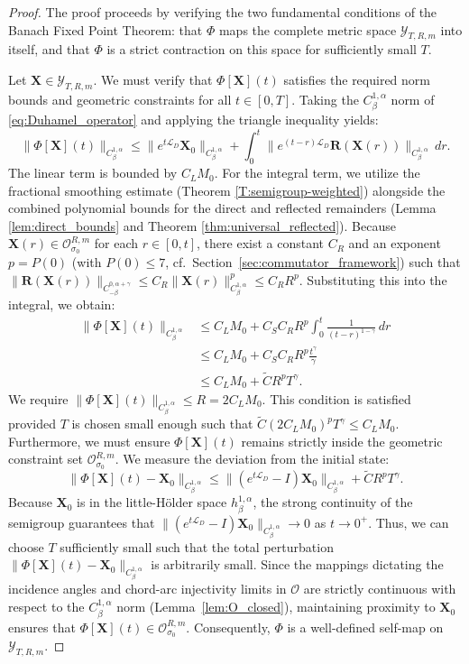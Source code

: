 \documentclass{amsart}
\begin{document}
\begin{proof}
The proof proceeds by verifying the two fundamental conditions of the Banach Fixed Point Theorem: that $\Phi$ maps the complete metric space $\mathcal{Y}_{T, R, m}$ into itself, and that $\Phi$ is a strict contraction on this space for sufficiently small $T$.


Let $\mathbf{X} \in \mathcal{Y}_{T, R, m}$. We must verify that $\Phi[\mathbf{X}](t)$ satisfies the required norm bounds and geometric constraints for all $t \in [0,T]$. Taking the $C^{1,\alpha}_\beta$ norm of \eqref{eq:Duhamel_operator} and applying the triangle inequality yields:
\[
\|\Phi[\mathbf{X}](t)\|_{C^{1,\alpha}_\beta} \le \|e^{t\mathcal{L}_D}\mathbf{X}_0\|_{C^{1,\alpha}_\beta} + \int_0^t \big\| e^{(t-r)\mathcal{L}_D} \mathbf{R}(\mathbf{X}(r)) \big\|_{C^{1,\alpha}_\beta} \, dr.
\]
The linear term is bounded by $C_L M_0$. For the integral term, we utilize the fractional smoothing estimate (Theorem \ref{T:semigroup-weighted}) alongside the combined polynomial bounds for the direct and reflected remainders (Lemma \ref{lem:direct_bounds} and Theorem \ref{thm:universal_reflected}). Because $\mathbf{X}(r) \in \mathcal{O}^{R, m}_{\sigma_0}$ for each $r \in [0,t]$, there exist a constant $C_R$ and an exponent $p=P(0)$ (with $P(0)\le 7$, cf.\ Section~\ref{sec:commutator_framework}) such that $\|\mathbf{R}(\mathbf{X}(r))\|_{C^{0,\alpha+\gamma}_{-\beta}} \le C_R \|\mathbf{X}(r)\|_{C^{1,\alpha}_\beta}^p \le C_R R^p$.
Substituting this into the integral, we obtain:
\begin{align*}
\|\Phi[\mathbf{X}](t)\|_{C^{1,\alpha}_\beta} 
&\le C_L M_0 + C_S C_R R^p \int_0^t \frac{1}{(t-r)^{1-\gamma}} \, dr \\
&\le C_L M_0 + C_S C_R R^p \frac{t^\gamma}{\gamma} \\
&\le C_L M_0 + \widetilde{C} R^p T^\gamma.
\end{align*}
We require $\|\Phi[\mathbf{X}](t)\|_{C^{1,\alpha}_\beta} \le R = 2 C_L M_0$. This condition is satisfied provided $T$ is chosen small enough such that $\widetilde{C} (2 C_L M_0)^p T^\gamma \le C_L M_0$. 
Furthermore, we must ensure $\Phi[\mathbf{X}](t)$ remains strictly inside the geometric constraint set $\mathcal{O}^{R, m}_{\sigma_0}$. We measure the deviation from the initial state:
\[
\|\Phi[\mathbf{X}](t) - \mathbf{X}_0\|_{C^{1,\alpha}_\beta} \le \|(e^{t\mathcal{L}_D} - I)\mathbf{X}_0\|_{C^{1,\alpha}_\beta} + \widetilde{C} R^p T^\gamma.
\]
Because $\mathbf{X}_0$ is in the little-Hölder space $h^{1,\alpha}_\beta$, the strong continuity of the semigroup guarantees that $\|(e^{t\mathcal{L}_D} - I)\mathbf{X}_0\|_{C^{1,\alpha}_\beta} \to 0$ as $t \to 0^+$. Thus, we can choose $T$ sufficiently small such that the total perturbation $\|\Phi[\mathbf{X}](t) - \mathbf{X}_0\|_{C^{1,\alpha}_\beta}$ is arbitrarily small. Since the mappings dictating the incidence angles and chord-arc injectivity limits in $\mathcal{O}$ are strictly continuous with respect to the $C^{1,\alpha}_\beta$ norm (Lemma~\ref{lem:O_closed}), maintaining proximity to $\mathbf{X}_0$ ensures that $\Phi[\mathbf{X}](t) \in \mathcal{O}^{R, m}_{\sigma_0}$. Consequently, $\Phi$ is a well-defined self-map on $\mathcal{Y}_{T, R, m}$.


\end{proof}
\end{document}
